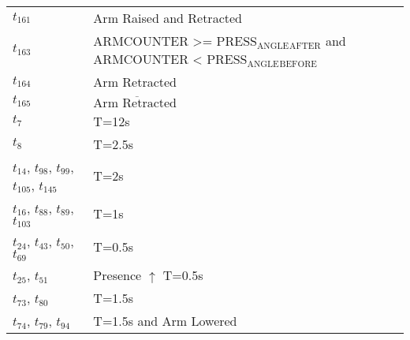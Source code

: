 \begin{longtable}{M{5cm}M{10cm}}
\hyperlink{completeNet:t161}{\hypertarget{completeTable:t161}{$t_{161}$}} & Arm Raised and Retracted\\
\hyperlink{completeNet:t163}{\hypertarget{completeTable:t163}{$t_{163}$}} & ARMCOUNTER >= PRESS\(_{\text{ANGLE}}\)\(_{\text{AFTER}}\) and ARMCOUNTER < PRESS\(_{\text{ANGLE}}\)\(_{\text{BEFORE}}\)\\
\hyperlink{completeNet:t164}{\hypertarget{completeTable:t164}{$t_{164}$}} & Arm Retracted\\
\hyperlink{completeNet:t165}{\hypertarget{completeTable:t165}{$t_{165}$}} & \(\overline{\mbox{Arm Retracted }}\)\\
\hyperlink{completeNet:tt7}{\hypertarget{completeTable:tt7}{$t_{7}$}} & T=12s\\
\hyperlink{completeNet:tt8}{\hypertarget{completeTable:tt8}{$t_{8}$}} & T=2.5s\\
\hyperlink{completeNet:tt14}{\hypertarget{completeTable:tt14}{$t_{14}$}}, \hyperlink{completeNet:tt98}{\hypertarget{completeTable:tt98}{$t_{98}$}}, \hyperlink{completeNet:tt99}{\hypertarget{completeTable:tt99}{$t_{99}$}}, \hyperlink{completeNet:tt105}{\hypertarget{completeTable:tt105}{$t_{105}$}}, \hyperlink{completeNet:tt145}{\hypertarget{completeTable:tt145}{$t_{145}$}} & T=2s\\
\hyperlink{completeNet:tt16}{\hypertarget{completeTable:tt16}{$t_{16}$}}, \hyperlink{completeNet:tt88}{\hypertarget{completeTable:tt88}{$t_{88}$}}, \hyperlink{completeNet:tt89}{\hypertarget{completeTable:tt89}{$t_{89}$}}, \hyperlink{completeNet:tt103}{\hypertarget{completeTable:tt103}{$t_{103}$}} & T=1s\\
\hyperlink{completeNet:tt24}{\hypertarget{completeTable:tt24}{$t_{24}$}}, \hyperlink{completeNet:tt43}{\hypertarget{completeTable:tt43}{$t_{43}$}}, \hyperlink{completeNet:tt50}{\hypertarget{completeTable:tt50}{$t_{50}$}}, \hyperlink{completeNet:tt69}{\hypertarget{completeTable:tt69}{$t_{69}$}} & T=0.5s\\
\hyperlink{completeNet:tt25}{\hypertarget{completeTable:tt25}{$t_{25}$}}, \hyperlink{completeNet:tt51}{\hypertarget{completeTable:tt51}{$t_{51}$}} & Presence \(\uparrow\) T=0.5s\\
\hyperlink{completeNet:tt73}{\hypertarget{completeTable:tt73}{$t_{73}$}}, \hyperlink{completeNet:tt80}{\hypertarget{completeTable:tt80}{$t_{80}$}} & T=1.5s\\
\hyperlink{completeNet:tt74}{\hypertarget{completeTable:tt74}{$t_{74}$}}, \hyperlink{completeNet:tt79}{\hypertarget{completeTable:tt79}{$t_{79}$}}, \hyperlink{completeNet:tt94}{\hypertarget{completeTable:tt94}{$t_{94}$}} & T=1.5s and Arm Lowered\\

\end{longtable}
